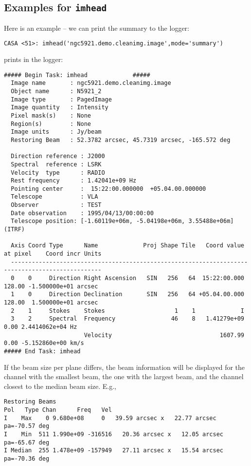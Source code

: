 \subsection{Examples for {\tt imhead}}
\label{section:analysis.imhead.examples}


Here is an example -- we can print the summary to the logger:
\small
\begin{verbatim}
CASA <51>: imhead('ngc5921.demo.cleanimg.image',mode='summary')
\end{verbatim}
\normalsize
prints in the logger: 
\small
\begin{verbatim}
##### Begin Task: imhead             #####
  Image name       : ngc5921.demo.cleanimg.image
  Object name      : N5921_2
  Image type       : PagedImage
  Image quantity   : Intensity
  Pixel mask(s)    : None
  Region(s)        : None
  Image units      : Jy/beam
  Restoring Beam   : 52.3782 arcsec, 45.7319 arcsec, -165.572 deg
  
  Direction reference : J2000
  Spectral  reference : LSRK
  Velocity  type      : RADIO
  Rest frequency      : 1.42041e+09 Hz
  Pointing center     :  15:22:00.000000  +05.04.00.000000
  Telescope           : VLA
  Observer            : TEST
  Date observation    : 1995/04/13/00:00:00
  Telescope position: [-1.60119e+06m, -5.04198e+06m, 3.55488e+06m] (ITRF)
  
  Axis Coord Type      Name             Proj Shape Tile   Coord value at pixel    Coord incr Units
  ------------------------------------------------------------------------------------------------ 
  0    0     Direction Right Ascension   SIN   256   64  15:22:00.000   128.00 -1.500000e+01 arcsec
  1    0     Direction Declination       SIN   256   64 +05.04.00.000   128.00  1.500000e+01 arcsec
  2    1     Stokes    Stokes                    1    1             I
  3    2     Spectral  Frequency                46    8   1.41279e+09     0.00 2.4414062e+04 Hz
                       Velocity                               1607.99     0.00 -5.152860e+00 km/s
##### End Task: imhead           
\end{verbatim}
\normalsize

If the beam size per plane differs, the beam information will be
displayed for the channel with the smallest beam, the one with the
largest beam, and the channel closest to the median beam size. E.g.,

\small
\begin{verbatim}
Restoring Beams
Pol   Type Chan      Freq   Vel
I    Max    0 9.680e+08     0   39.59 arcsec x   22.77 arcsec pa=-70.57 deg
I    Min  511 1.990e+09 -316516   20.36 arcsec x   12.05 arcsec pa=-65.67 deg
I Median  255 1.478e+09 -157949   27.11 arcsec x   15.54 arcsec pa=-70.36 deg 
\end{verbatim}
\normalsize

